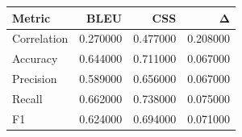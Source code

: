 \begin{tabular}{lrrr}
\toprule
Metric & BLEU & CSS & Δ \\
\midrule
Correlation & 0.270000 & 0.477000 & 0.208000 \\
Accuracy & 0.644000 & 0.711000 & 0.067000 \\
Precision & 0.589000 & 0.656000 & 0.067000 \\
Recall & 0.662000 & 0.738000 & 0.075000 \\
F1 & 0.624000 & 0.694000 & 0.071000 \\
\bottomrule
\end{tabular}
